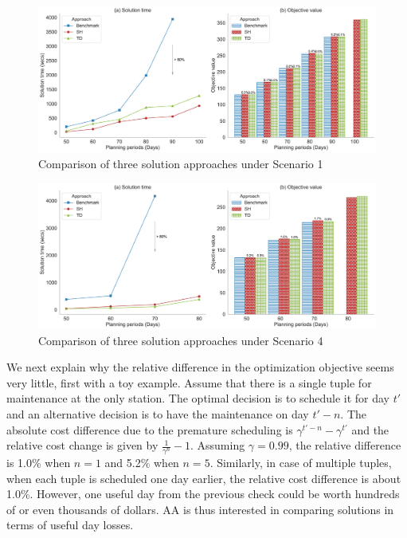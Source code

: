 \begin{figure}[htbp]
    \centering
    \includegraphics[width=\linewidth]{comb_compS1_v1.pdf}
    \caption{Comparison of three solution approaches under Scenario 1}
    \label{fig:comparisonS1}
\end{figure}

\begin{figure}[htbp]
    \centering
    \includegraphics[width=\linewidth]{comb_compS4_v1.pdf}
    \caption{Comparison of three solution approaches under Scenario 4}
    \label{fig:comparisonS4}
\end{figure}


We next explain why the relative difference in the optimization objective seems very little, first with a toy example. Assume that there is a single tuple for maintenance at the only station. The optimal decision is to schedule it for day $t\prime$ and an alternative decision is to have the maintenance on day $t\prime-n$. The absolute cost difference due to the premature scheduling is $\gamma^{t\prime-n} - \gamma^{t\prime}$ and the relative cost change is given by $\frac{1}{\gamma^n} - 1$. Assuming $\gamma = 0.99$, the relative difference is 1.0\% when $n = 1$ and 5.2\% when $n = 5$. Similarly, in case of multiple tuples, when each tuple is scheduled one day earlier, the relative cost difference is about 1.0\%. However, one useful day from the previous check could be worth hundreds of or even thousands of dollars. AA is thus interested in comparing solutions in terms of useful day losses. 

